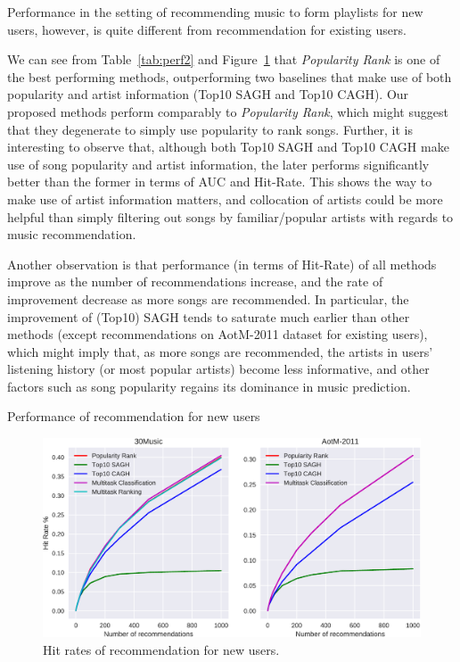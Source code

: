 Performance in the setting of recommending music to form playlists for new users, 
however, is quite different from recommendation for existing users.

We can see from Table~\ref{tab:perf2} and Figure~\ref{fig:hr2} that {\it Popularity Rank} is one of the best performing methods,
outperforming two baselines that make use of both popularity and artist information (\ie Top10 SAGH and Top10 CAGH).
Our proposed methods perform comparably to {\it Popularity Rank}, which might suggest that they degenerate to simply use popularity to rank songs.
Further, it is interesting to observe that, although both Top10 SAGH and Top10 CAGH make use of song popularity and artist information,
the later performs significantly better than the former in terms of AUC and Hit-Rate.
This shows the way to make use of artist information matters,
and collocation of artists could be more helpful than simply filtering out songs by familiar/popular artists
with regards to music recommendation.

Another observation is that performance (in terms of Hit-Rate) of all methods improve as the number of recommendations increase,
and the rate of improvement decrease as more songs are recommended.
In particular, the improvement of (Top10) SAGH tends to saturate much earlier than other methods 
(except recommendations on AotM-2011 dataset for existing users),
which might imply that, as more songs are recommended, the artists in users' listening history
(or most popular artists) become less informative,
and other factors such as song popularity regains its dominance in music prediction.

\begin{table}[t]
\centering
\caption{Performance of recommendation for new users}
\label{tab:perf2}
\resizebox{\columnwidth}{!}{

}
\end{table}


\begin{figure}[t]
\centering
\includegraphics[width=\linewidth]{fig/hitrate2.pdf}
\caption{Hit rates of recommendation for new users.}
\label{fig:hr2}
\end{figure}
